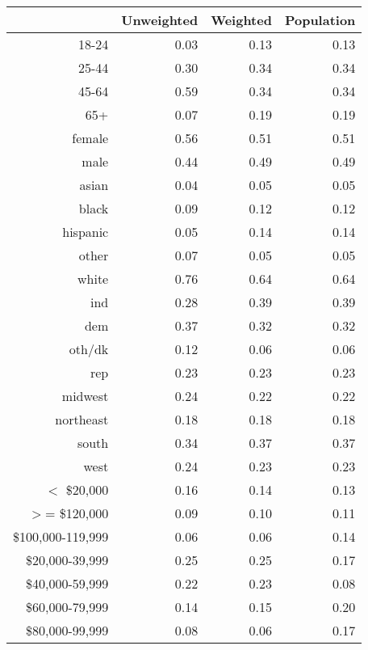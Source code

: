 \begin{table}[ht]
\centering
\begin{tabular}{rrrr}
  \hline
 & Unweighted & Weighted & Population \\ 
  \hline
18-24 & 0.03 & 0.13 & 0.13 \\ 
  25-44 & 0.30 & 0.34 & 0.34 \\ 
  45-64 & 0.59 & 0.34 & 0.34 \\ 
  65+ & 0.07 & 0.19 & 0.19 \\ 
  female & 0.56 & 0.51 & 0.51 \\ 
  male & 0.44 & 0.49 & 0.49 \\ 
  asian & 0.04 & 0.05 & 0.05 \\ 
  black & 0.09 & 0.12 & 0.12 \\ 
  hispanic & 0.05 & 0.14 & 0.14 \\ 
  other & 0.07 & 0.05 & 0.05 \\ 
  white & 0.76 & 0.64 & 0.64 \\ 
  ind & 0.28 & 0.39 & 0.39 \\ 
  dem & 0.37 & 0.32 & 0.32 \\ 
  oth/dk & 0.12 & 0.06 & 0.06 \\ 
  rep & 0.23 & 0.23 & 0.23 \\ 
  midwest & 0.24 & 0.22 & 0.22 \\ 
  northeast & 0.18 & 0.18 & 0.18 \\ 
  south & 0.34 & 0.37 & 0.37 \\ 
  west & 0.24 & 0.23 & 0.23 \\ 
  $<$ \$20,000 & 0.16 & 0.14 & 0.13 \\ 
  $>$= \$120,000 & 0.09 & 0.10 & 0.11 \\ 
  \$100,000-119,999 & 0.06 & 0.06 & 0.14 \\ 
  \$20,000-39,999 & 0.25 & 0.25 & 0.17 \\ 
  \$40,000-59,999 & 0.22 & 0.23 & 0.08 \\ 
  \$60,000-79,999 & 0.14 & 0.15 & 0.20 \\ 
  \$80,000-99,999 & 0.08 & 0.06 & 0.17 \\ 
   \hline
\end{tabular}
\end{table}
